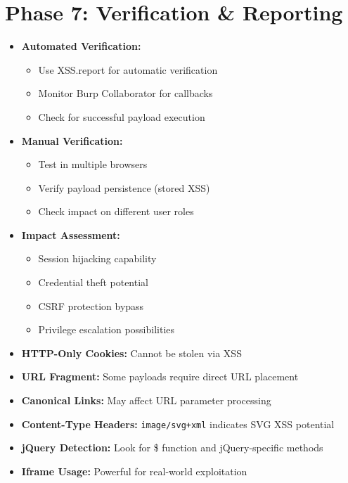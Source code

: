 \documentclass[12pt]{article}
\begin{document}
\section{Phase 7: Verification \& Reporting}

\begin{tcolorbox}[title={\textbf{7.1 Verification Methods}}, colback=lightgreen]
\begin{itemize}[leftmargin=*]
    \item \textbf{Automated Verification:}
    \begin{itemize}
        \item Use XSS.report for automatic verification
        \item Monitor Burp Collaborator for callbacks
        \item Check for successful payload execution
    \end{itemize}
    
    \item \textbf{Manual Verification:}
    \begin{itemize}
        \item Test in multiple browsers
        \item Verify payload persistence (stored XSS)
        \item Check impact on different user roles
    \end{itemize}
    
    \item \textbf{Impact Assessment:}
    \begin{itemize}
        \item Session hijacking capability
        \item Credential theft potential
        \item CSRF protection bypass
        \item Privilege escalation possibilities
    \end{itemize}
\end{itemize}
\end{tcolorbox}

\begin{tcolorbox}[title={\textbf{7.2 Key Testing Notes}}, colback=lightred]
\begin{itemize}[leftmargin=*]
    \item \textbf{HTTP-Only Cookies:} Cannot be stolen via XSS
    \item \textbf{URL Fragment:} Some payloads require direct URL placement
    \item \textbf{Canonical Links:} May affect URL parameter processing
    \item \textbf{Content-Type Headers:} \texttt{image/svg+xml} indicates SVG XSS potential
    \item \textbf{jQuery Detection:} Look for \$ function and jQuery-specific methods
    \item \textbf{Iframe Usage:} Powerful for real-world exploitation
\end{itemize}
\end{tcolorbox}
\end{document}
